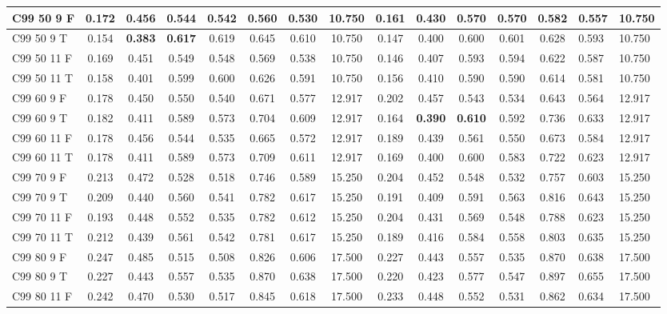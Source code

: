 \documentclass{article}
\begin{document}
\begin{longtable}[c]{|l|c|c|c|c|c|c||c|c|c|c|c|c|}
C99 50  9 F & 0.172 & 0.456 & 0.544 & 0.542 & 0.560 & 0.530 & 10.750 & 0.161 & 0.430 & 0.570 & 0.570 & 0.582 & 0.557 & 10.750\\ \hline
C99 50  9 T & 0.154 & \textbf{0.383} & \textbf{0.617} & 0.619 & 0.645 & 0.610 & 10.750 & 0.147 & 0.400 & 0.600 & 0.601 & 0.628 & 0.593 & 10.750\\ \hline
C99 50 11 F & 0.169 & 0.451 & 0.549 & 0.548 & 0.569 & 0.538 & 10.750 & 0.146 & 0.407 & 0.593 & 0.594 & 0.622 & 0.587 & 10.750\\ \hline
C99 50 11 T & 0.158 & 0.401 & 0.599 & 0.600 & 0.626 & 0.591 & 10.750 & 0.156 & 0.410 & 0.590 & 0.590 & 0.614 & 0.581 & 10.750\\ \hline
C99 60  9 F & 0.178 & 0.450 & 0.550 & 0.540 & 0.671 & 0.577 & 12.917 & 0.202 & 0.457 & 0.543 & 0.534 & 0.643 & 0.564 & 12.917\\ \hline
C99 60  9 T & 0.182 & 0.411 & 0.589 & 0.573 & 0.704 & 0.609 & 12.917 & 0.164 & \textbf{0.390} & \textbf{0.610} & 0.592 & 0.736 & 0.633 & 12.917\\ \hline
C99 60 11 F & 0.178 & 0.456 & 0.544 & 0.535 & 0.665 & 0.572 & 12.917 & 0.189 & 0.439 & 0.561 & 0.550 & 0.673 & 0.584 & 12.917\\ \hline
C99 60 11 T & 0.178 & 0.411 & 0.589 & 0.573 & 0.709 & 0.611 & 12.917 & 0.169 & 0.400 & 0.600 & 0.583 & 0.722 & 0.623 & 12.917\\ \hline
C99 70  9 F & 0.213 & 0.472 & 0.528 & 0.518 & 0.746 & 0.589 & 15.250 & 0.204 & 0.452 & 0.548 & 0.532 & 0.757 & 0.603 & 15.250\\ \hline
C99 70  9 T & 0.209 & 0.440 & 0.560 & 0.541 & 0.782 & 0.617 & 15.250 & 0.191 & 0.409 & 0.591 & 0.563 & 0.816 & 0.643 & 15.250\\ \hline
C99 70 11 F & 0.193 & 0.448 & 0.552 & 0.535 & 0.782 & 0.612 & 15.250 & 0.204 & 0.431 & 0.569 & 0.548 & 0.788 & 0.623 & 15.250\\ \hline
C99 70 11 T & 0.212 & 0.439 & 0.561 & 0.542 & 0.781 & 0.617 & 15.250 & 0.189 & 0.416 & 0.584 & 0.558 & 0.803 & 0.635 & 15.250\\ \hline
C99 80  9 F & 0.247 & 0.485 & 0.515 & 0.508 & 0.826 & 0.606 & 17.500 & 0.227 & 0.443 & 0.557 & 0.535 & 0.870 & 0.638 & 17.500\\ \hline
C99 80  9 T & 0.227 & 0.443 & 0.557 & 0.535 & 0.870 & 0.638 & 17.500 & 0.220 & 0.423 & 0.577 & 0.547 & 0.897 & 0.655 & 17.500\\ \hline
C99 80 11 F & 0.242 & 0.470 & 0.530 & 0.517 & 0.845 & 0.618 & 17.500 & 0.233 & 0.448 & 0.552 & 0.531 & 0.862 & 0.634 & 17.500\\ \hline

\end{longtable}
\end{document}
